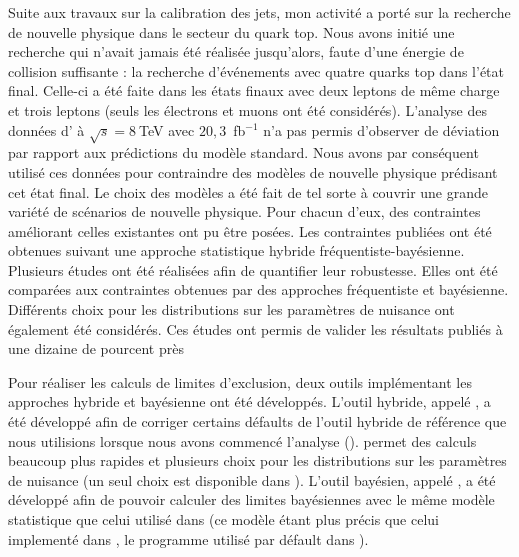 Suite aux travaux sur la calibration des jets, mon activit\'e a port\'e sur la recherche de nouvelle physique dans le secteur du quark top. 
Nous avons initi\'e une recherche qui n'avait jamais \'et\'e r\'ealis\'ee jusqu'alors, faute d'une \'energie de collision suffisante : la recherche d'\'ev\'enements avec quatre quarks top dans l'\'etat final. 
Celle-ci a \'et\'e faite dans les \'etats finaux avec deux leptons de m\^eme charge et trois leptons (seuls les \'electrons et muons ont \'et\'e consid\'er\'es). 
L'analyse des donn\'ees d'\ATLAS{} \`a $\sqrt{s}=8~$TeV avec $20,3$~fb$^{-1}$ n'a pas permis d'observer 
de d\'eviation par rapport aux pr\'edictions du mod\`ele standard.
Nous avons par cons\'equent utilis\'e ces donn\'ees pour contraindre des mod\`eles de nouvelle physique pr\'edisant cet \'etat final. 
Le choix des mod\`eles a \'et\'e fait de tel sorte \`a couvrir une grande vari\'et\'e de sc\'enarios de nouvelle physique. 
Pour chacun d'eux, des contraintes am\'eliorant celles existantes ont pu \^etre pos\'ees.
Les contraintes publi\'ees ont \'et\'e obtenues suivant une approche statistique hybride fr\'equentiste-bay\'esienne. 
Plusieurs \'etudes ont \'et\'e r\'ealis\'ees afin de quantifier leur robustesse.
Elles ont \'et\'e compar\'ees aux contraintes obtenues par des approches fr\'equentiste et bay\'esienne.
Diff\'erents choix pour les distributions \prior{} sur les param\`etres de nuisance ont \'egalement \'et\'e consid\'er\'es.  
Ces \'etudes ont permis de valider les r\'esultats publi\'es \`a une dizaine de pourcent pr\`es

Pour r\'ealiser les calculs de limites d'exclusion, deux outils impl\'ementant les approches hybride et bay\'esienne ont \'et\'e d\'evelopp\'es. 
L'outil hybride, appel\'e \opthylic, a \'et\'e d\'evelopp\'e afin de corriger certains d\'efaults de l'outil hybride de r\'ef\'erence que nous utilisions lorsque nous avons commenc\'e l'analyse (\mclimit). 
\opthylic{} permet des calculs beaucoup plus rapides et plusieurs choix pour les distributions \prior{} sur les param\`etres de nuisance (un seul choix est disponible dans \mclimit). 
L'outil bay\'esien, appel\'e \tifosi, a \'et\'e d\'evelopp\'e afin de pouvoir calculer des limites bay\'esiennes avec le m\^eme mod\`ele statistique que celui utilis\'e dans \opthylic{} (ce mod\`ele \'etant plus pr\'ecis que celui implement\'e dans \histfactory{}, le programme utilis\'e par d\'efault dans \ATLAS). 

